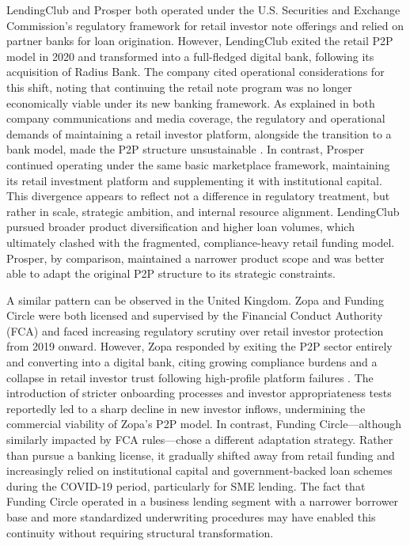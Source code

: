 \documentclass[pdflatex,sn-apa]{sn-jnl}%
\theoremstyle{thmstyleone}%
\theoremstyle{thmstyletwo}%
\theoremstyle{thmstylethree}%
\begin{document}
\textcolor{NavyBlue}{
LendingClub and Prosper both operated under the U.S. Securities and Exchange Commission’s regulatory framework for retail investor note offerings and relied on partner banks for loan origination. However, LendingClub exited the retail P2P model in 2020 and transformed into a full-fledged digital bank, following its acquisition of Radius Bank. The company cited operational considerations for this shift, noting that continuing the retail note program was no longer economically viable under its new banking framework. As explained in both company communications and media coverage, the regulatory and operational demands of maintaining a retail investor platform, alongside the transition to a bank model, made the P2P structure unsustainable \citep{lendingclub_bank_does_2023, dan_ennis_lendingclub_2020}. In contrast, Prosper continued operating under the same basic marketplace framework, maintaining its retail investment platform and supplementing it with institutional capital. This divergence appears to reflect not a difference in regulatory treatment, but rather in scale, strategic ambition, and internal resource alignment. LendingClub pursued broader product diversification and higher loan volumes, which ultimately clashed with the fragmented, compliance-heavy retail funding model. Prosper, by comparison, maintained a narrower product scope and was better able to adapt the original P2P structure to its strategic constraints.
}

\textcolor{NavyBlue}{
A similar pattern can be observed in the United Kingdom. Zopa and Funding Circle were both licensed and supervised by the Financial Conduct Authority (FCA) and faced increasing regulatory scrutiny over retail investor protection from 2019 onward. However, Zopa responded by exiting the P2P sector entirely and converting into a digital bank, citing growing compliance burdens and a collapse in retail investor trust following high-profile platform failures \citep{zopa_bank_limited_update_2021}. The introduction of stricter onboarding processes and investor appropriateness tests reportedly led to a sharp decline in new investor inflows, undermining the commercial viability of Zopa’s P2P model. In contrast, Funding Circle—although similarly impacted by FCA rules—chose a different adaptation strategy. Rather than pursue a banking license, it gradually shifted away from retail funding and increasingly relied on institutional capital and government-backed loan schemes during the COVID-19 period, particularly for SME lending. The fact that Funding Circle operated in a business lending segment with a narrower borrower base and more standardized underwriting procedures may have enabled this continuity without requiring structural transformation.
}
\end{document}
